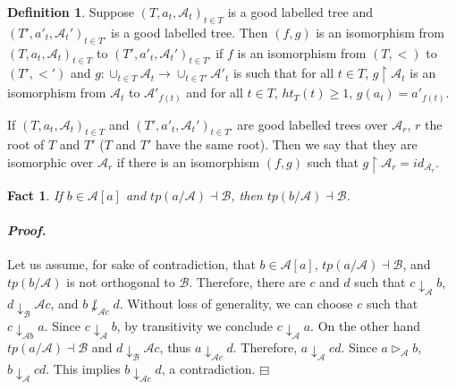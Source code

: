 \documentclass[12pt,a4paper]{amsart}
\newtheorem{fact}[thm]{Fact}
\theoremstyle{definition}
\newtheorem{defn}[thm]{Definition}
\theoremstyle{remark}
\renewcommand{\restriction}{\mathbin\upharpoonright}
\newenvironment{cproof}{\paragraph{\emph{Proof.\,}}}{\hfill{$\boxminus$}\par\vspace{2mm}}
\begin{document}
\begin{defn}
    Suppose $(T,a_t,\mathcal{A}_t)_{t\in T}$ is a good labelled tree and $(T',a'_t,\mathcal{A}_t')_{t\in T'}$ is a good labelled tree. Then $(f,g)$ is an isomorphism  from $(T,a_t,\mathcal{A}_t)_{t\in T}$ to $(T',a'_t,\mathcal{A}_t')_{t\in T'}$ if $f$ is an isomorphism from $(T,<)$ to $(T',<')$ and $g:\cup_{t\in T}\mathcal{A}_t\rightarrow\cup_{t\in T'}\mathcal{A}'_t$ is such that for all $t\in T$, $g\restriction \mathcal{A}_t$ is an isomorphism from $\mathcal{A}_t$ to $\mathcal{A}'_{f(t)}$ and for all $t\in T$, $ht_T(t)\ge 1$, $g(a_t)=a'_{f(t)}$.

\end{defn}

If $(T,a_t,\mathcal{A}_t)_{t\in T}$ and $(T',a'_t,\mathcal{A}_t')_{t\in T'}$ are good labelled trees over $\mathcal{A}_r$, $r$ the root of $T$ and $T'$ ($T$ and $T'$ have the same root). Then we say that they are isomorphic over $\mathcal{A}_r$ if there is an isomorphism $(f,g)$ such that $g\restriction \mathcal{A}_r=id_{\mathcal{A}_r}$.


\begin{fact}
    If $b\in \mathcal{A}[a]$ and $tp(a/\mathcal{A})\dashv \mathcal{B}$, then $tp(b/\mathcal{A})\dashv\mathcal{B}$. 
\end{fact}
\begin{cproof}
    Let us assume, for sake of contradiction, that $b\in \mathcal{A}[a]$, $tp(a/\mathcal{A})\dashv \mathcal{B}$, and $tp(b/\mathcal{A})$ is not orthogonal to $\mathcal{B}$. Therefore, there are $c$ and $d$ such that $c\downarrow_{\mathcal{A}}b$, $d\downarrow_{\mathcal{B}}\mathcal{A}c$, and $b\not\downarrow_{\mathcal{A}c}d$. Without loss of generality, we can choose $c$ such that $c\downarrow_{\mathcal{A}b}a$. Since $c\downarrow_\mathcal{A} b$, by transitivity we conclude $c\downarrow_\mathcal{A} a$. On the other hand $tp(a/\mathcal{A})\dashv\mathcal{B}$ and $d\downarrow_{\mathcal{B}}\mathcal{A}c$, thus $a\downarrow_{\mathcal{A}c}d$. Therefore, $a\downarrow_{\mathcal{A}}cd$. Since $a\triangleright_\mathcal{A}b$, $b\downarrow_{\mathcal{A}}cd$. This implies $b\downarrow_{\mathcal{A}c}d$, a contradiction.
\end{cproof}
\end{document}
